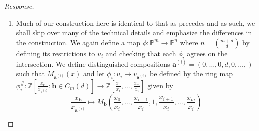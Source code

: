 \documentclass[english,letter,doublesided]{article}
\renewcommand\vec{\mathbf}
\newcommand{\evat}[3]{\left. #1\right|_{#2}^{#3}}
\DeclareMathOperator{\spec}{Spec}
\newcommand{\mor}{\mathrm{Mor}}
\newcommand{\ZZ}{\mathbb{Z}}
\newcommand{\PP}{\mathbb{P}}
\theoremstyle{remark}
\theoremstyle{definition}
\newcommand{\id}{\mathrm{id} }
\newcommand{\im}{\mathrm{Im}}
\newcommand{\cat}[1]{{\mathrm{\bf{#1}}}}
\newcommand{\restr}[2]{{\evat{#1}{#2}{}}}
\newcommand{\fv}[2]{\frac{x_{#1}}{x_{#2}}}
\newcommand{\va}{\vec{a}}
\newcommand{\vai}[1]{\va^{(#1)}}
\begin{document}
\begin{proof}[Response]
\begin{enumerate}[label=\textit{(\roman*)}]
Letting $S$ be a scheme, we let $\PP^k_S=\PP^k\times_{\ZZ}S$ and have (from problem 7)\footnote{ooh fun a forward reference!} that there is a natural\footnote{Is this a correct usage of the word natural? I'm not sure\textemdash all I mean by it is that the bijection is induced by the universal property of the product.} bijection $\mor_\cat{Sch}(\PP^m_S,\PP^n_S)\equiv \mor_\cat{Sch}(\PP^m_S,\PP^k)\times \mor_\cat{Sch}(\PP^m_S,S)$. We consider $\Phi$, the map given by $(\phi,\id_S)$ in the case that $S=\spec k$ and restrict to $u_i\times_\ZZ S\cong \spec \ZZ[\fv{0}{i},\hdots,\fv{m}{i}]\otimes_\ZZ k\cong \spec k[\fv{0}{i},\hdots,\fv{m}{i}]\subset \PP^m_S$. 
Then, $\restr{\Phi}{{u_i\times_\ZZ S}}:u_i\times_\ZZ S\to v_i\times_\ZZ S$ 
corresponds to the ring morphism $ \restr{\Phi}{{u_{i} {\times}_{\ZZ} S}}^\#:k[\fv{0}{i},\hdots,\fv{n}{i}]\to k[\fv{0}{i},\hdots,\fv{m}{i}]$ by  \begin{equation*}
\fv{\ell}{i}\mapsto \begin{cases}running texstudio command within a macro
\fv{\ell}{i}&\ell\leq m\\0&\text{else}
\end{cases}\end{equation*}
So for any $k$-point $\gamma:\spec k\to \PP^m_k$ over $S$ corresponding to $[a_0:\hdots:a_m]$ where $a_j=\gamma_i(\fv{j}{i})$ for some $i$ such that $\im(\gamma)\subset u_i$ as topological spaces when $j\neq i$ and $a_i=1$, we have that the $k$-point of $\PP^n_k$ given by $\Phi\circ \gamma$ corresponds to the composition of ring maps $k[\fv{0}{i},\hdots,\fv{n}{i}]\to k[\fv{0}{i},\hdots,\fv{m}{i}]\to k$ by 
\begin{equation*}
	\fv{\ell}{i}\mapsto \begin{cases}
	\fv{\ell}{i}&\ell\leq m\\
	0&else
	\end{cases}\mapsto  \begin{cases}
\gamma_i(	\fv{\ell}{i})=a_i&\ell\leq m\\
	0&else
	\end{cases}
\end{equation*}
and hence the induced map on $k$-points is given by $[a_0:\hdots:a_m]\mapsto [a_0:\hdots:a_m:0:\hdots:0]$
	\item Much of our construction here is identical to that as precedes and as such, we shall skip over many of the technical details and emphasize the differences in the construction. We again define a map $\phi:\PP^m\to \PP^n$ where $n={m+d\choose d}$ by defining its restrictions to $u_i$ and checking that each $\phi_i$ agrees on the intersection. We define distinguished compositions $\vec{a}^{(i)}=(0,\hdots,0,d,0,\hdots,)$ such that $M_{\vai{i}}(x)$ and let $\phi_i:u_i\to v_{\vec{a}^{(i)}}$ be defined by the ring map $\phi_i^\#:\ZZ[\fv{\vec{b}}{\vai{i}}:\vec{b}\in C_m(d)]\to \ZZ[\fv{0}{i},\hdots,\fv{m}{i}]$ given by $$\fv{\vec{b}}{\vai{i}}\mapsto M_{\vec{b}}\left(\fv{0}{i},\hdots,\fv{i-1}{i},1,\fv{i+1}{i},\hdots,\fv{m}{i}\right)$$

\end{enumerate}
\end{proof}
\end{document}
